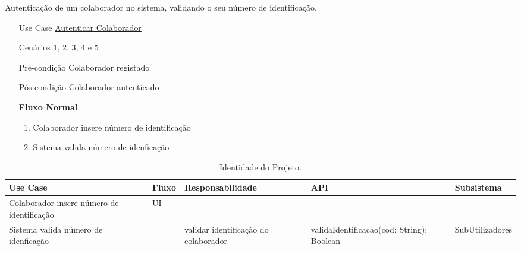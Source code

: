\documentclass[../relatorio.tex]{subfiles}
\begin{document}
Autenticação de um colaborador no sistema, validando o seu número de identificação.
\begin{itemize}
    \item[Use Case] {\underline{Autenticar Colaborador}}
    \item[Cenários] {1, 2, 3, 4 e 5}
    \item[Pré-condição] {Colaborador registado}
    \item[Pós-condição] {Colaborador autenticado}
          \begin{flushleft}
              \textbf{Fluxo Normal}
          \end{flushleft}
          \begin{enumerate}
              \item Colaborador insere número de identificação
              \item Sistema valida número de idenficação
          \end{enumerate}
\end{itemize}
\begin{landscape}
    \begin{table}[!h]
        \centering
        \begin{tabular}{|p{5cm}|p{1cm}|p{4cm}|p{6cm}|p{3cm}|}
            \hline
            \rowcolor{gray!20!white}
            Use Case         & 
            Fluxo            & 
            Responsabilidade & 
            API              & 
            Subsistema
            \\
            \hline
            \rowcolor{yellow}
            Colaborador insere número de identificação
                             & UI
                             & 
                             & 
                             & 
            \\
            \hline
            Sistema valida número de idenficação
                             & 
                             & validar identificação do colaborador
                             & validaIdentificacao(cod: String): Boolean
                             & SubUtilizadores
            \\
            \hline
        \end{tabular}
        \caption{Identidade do Projeto.}
    \end{table}
\end{landscape}
\end{document}
